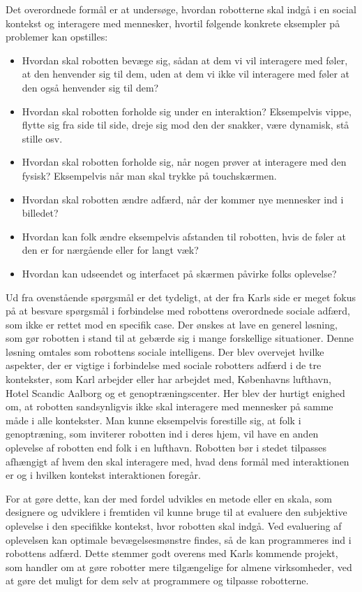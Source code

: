 Det overordnede formål er at undersøge, hvordan robotterne skal indgå i en social kontekst og interagere med mennesker, hvortil følgende konkrete eksempler på problemer kan opstilles:\blankline
\begin{itemize}
  \item Hvordan skal robotten bevæge sig, sådan at dem vi vil interagere med føler, at den henvender sig til dem, uden at dem vi ikke vil interagere med føler at den også henvender sig til dem?
  \item Hvordan skal robotten forholde sig under en interaktion? Eksempelvis vippe, flytte sig fra side til side, dreje sig mod den der snakker, være dynamisk, stå stille osv.
  \item Hvordan skal robotten forholde sig, når nogen prøver at interagere med den fysisk? Eksempelvis når man skal trykke på touchskærmen.
  \item Hvordan skal robotten ændre adfærd, når der kommer nye mennesker ind i billedet?
  \item Hvordan kan folk ændre eksempelvis afstanden til robotten, hvis de føler at den er for nærgående eller for langt væk?
  \item Hvordan kan udseendet og interfacet på skærmen påvirke folks oplevelse?\blankline
\end{itemize}
\noindent
%
Ud fra ovenstående spørgsmål er det tydeligt, at der fra Karls side er meget fokus på at besvare spørgsmål i forbindelse med robottens overordnede sociale adfærd, som ikke er rettet mod en specifik case. Der ønskes at lave en generel løsning, som gør robotten i stand til at gebærde sig i mange forskellige situationer. Denne løsning omtales som robottens sociale intelligens.\blankline 
%
Der blev overvejet hvilke aspekter, der er vigtige i forbindelse med sociale robotters adfærd i de tre kontekster, som Karl arbejder eller har arbejdet med, Københavns lufthavn, Hotel Scandic Aalborg og et genoptræningscenter. Her blev der hurtigt enighed om, at robotten sandsynligvis ikke skal interagere med mennesker på samme måde i alle kontekster. Man kunne eksempelvis forestille sig, at folk i genoptræning, som inviterer robotten ind i deres hjem, vil have en anden oplevelse af robotten end folk i en lufthavn. Robotten bør i stedet tilpasses afhængigt af hvem den skal interagere med, hvad dens formål med interaktionen er og i hvilken kontekst interaktionen foregår.

For at gøre dette, kan der med fordel udvikles en metode eller en skala, som designere og udviklere i fremtiden vil kunne bruge til at evaluere den subjektive oplevelse i den specifikke kontekst, hvor robotten skal indgå. Ved evaluering af oplevelsen kan optimale bevægelsesmønstre findes, så de kan programmeres ind i robottens adfærd. Dette stemmer godt overens med Karls kommende projekt, som handler om at gøre robotter mere tilgængelige for almene virksomheder, ved at gøre det muligt for dem selv at programmere og tilpasse robotterne.

